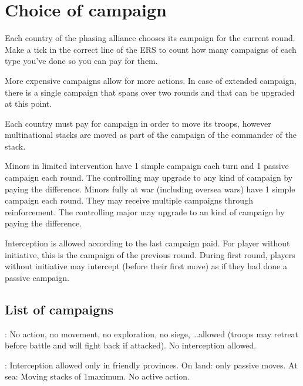 \section{Choice of campaign}
\label{chMilitary:Choice of campaign}
Each country of the phasing alliance chooses its campaign for the current
round. Make a tick in the correct line of the ERS to count how many campaigns
of each type you've done so you can pay for them.

More expensive campaigns allow for more actions. In case of extended campaign,
there is a single campaign that spans over two rounds and that can be upgraded
at this point.

Each country must pay for campaign in order to move its troops, however
multinational stacks are moved as part of the campaign of the commander of the
stack.

\bparag Minors in limited intervention have 1 simple campaign each turn and 1
passive campaign each round. The controlling \MAJ may upgrade to any kind of
campaign by paying the difference.
\bparag Minors fully at war (including oversea wars) have 1 simple campaign
each round. They may receive multiple campaigns through reinforcement. The
controlling major may upgrade to an kind of campaign by paying the
difference.

 Interception is allowed according to the
last campaign paid.
\bparag For player without initiative, this is the campaign of the previous
round.
\bparag During first round, players without initiative may intercept (before
their first move) as if they had done a passive campaign.

\subsection{List of campaigns}
\ducats: No action, no movement, no exploration, no siege,
\ldots allowed (troops may retreat before battle and will fight back if
attacked). No interception allowed.

\ducats:
\bparag Interception allowed only in friendly provinces.
\bparag On land: only passive moves.
\bparag At sea: Moving stacks of 1\FLEET maximum. No active action.

